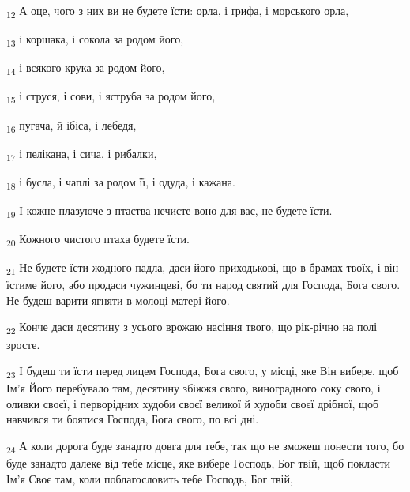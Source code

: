 \begin{tcolorbox}
\textsubscript{12} А оце, чого з них ви не будете їсти: орла, і ґрифа, і морського орла,
\end{tcolorbox}
\begin{tcolorbox}
\textsubscript{13} і коршака, і сокола за родом його,
\end{tcolorbox}
\begin{tcolorbox}
\textsubscript{14} і всякого крука за родом його,
\end{tcolorbox}
\begin{tcolorbox}
\textsubscript{15} і струся, і сови, і яструба за родом його,
\end{tcolorbox}
\begin{tcolorbox}
\textsubscript{16} пугача, й ібіса, і лебедя,
\end{tcolorbox}
\begin{tcolorbox}
\textsubscript{17} і пелікана, і сича, і рибалки,
\end{tcolorbox}
\begin{tcolorbox}
\textsubscript{18} і бусла, і чаплі за родом її, і одуда, і кажана.
\end{tcolorbox}
\begin{tcolorbox}
\textsubscript{19} І кожне плазуюче з птаства нечисте воно для вас, не будете їсти.
\end{tcolorbox}
\begin{tcolorbox}
\textsubscript{20} Кожного чистого птаха будете їсти.
\end{tcolorbox}
\begin{tcolorbox}
\textsubscript{21} Не будете їсти жодного падла, даси його приходькові, що в брамах твоїх, і він їстиме його, або продаси чужинцеві, бо ти народ святий для Господа, Бога свого. Не будеш варити ягняти в молоці матері його.
\end{tcolorbox}
\begin{tcolorbox}
\textsubscript{22} Конче даси десятину з усього врожаю насіння твого, що рік-річно на полі зросте.
\end{tcolorbox}
\begin{tcolorbox}
\textsubscript{23} І будеш ти їсти перед лицем Господа, Бога свого, у місці, яке Він вибере, щоб Ім'я Його перебувало там, десятину збіжжя свого, виноградного соку свого, і оливки своєї, і перворідних худоби своєї великої й худоби своєї дрібної, щоб навчився ти боятися Господа, Бога свого, по всі дні.
\end{tcolorbox}
\begin{tcolorbox}
\textsubscript{24} А коли дорога буде занадто довга для тебе, так що не зможеш понести того, бо буде занадто далеке від тебе місце, яке вибере Господь, Бог твій, щоб покласти Ім'я Своє там, коли поблагословить тебе Господь, Бог твій,
\end{tcolorbox}
